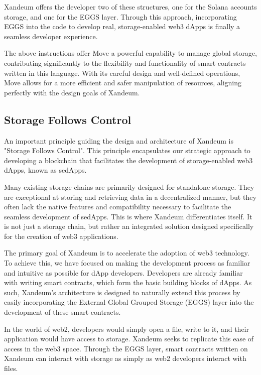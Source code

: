 \documentclass[11pt]{article}   	%
\begin{document}
Xandeum offers the developer two of these structures, one for the Solana accounts storage, and one for the EGGS layer. Through this approach, incorporating EGGS into the code to develop real, storage-enabled web3 dApps is finally a seamless developer experience.

The above instructions offer Move a powerful capability to manage global storage, contributing significantly to the flexibility and functionality of smart contracts written in this language. With its careful design and well-defined operations, Move allows for a more efficient and safer manipulation of resources, aligning perfectly with the design goals of Xandeum.

\subsection{Storage Follows Control}
An important principle guiding the design and architecture of Xandeum is "Storage Follows Control". This principle encapsulates our strategic approach to developing a blockchain that facilitates the development of storage-enabled web3 dApps, known as sedApps.

Many existing storage chains are primarily designed for standalone storage. They are exceptional at storing and retrieving data in a decentralized manner, but they often lack the native features and compatibility necessary to facilitate the seamless development of sedApps. This is where Xandeum differentiates itself. It is not just a storage chain, but rather an integrated solution designed specifically for the creation of web3 applications.

The primary goal of Xandeum is to accelerate the adoption of web3 technology. To achieve this, we have focused on making the development process as familiar and intuitive as possible for dApp developers. Developers are already familiar with writing smart contracts, which form the basic building blocks of dApps. As such, Xandeum's architecture is designed to naturally extend this process by easily incorporating the External Global Grouped Storage (EGGS) layer into the development of these smart contracts.

In the world of web2, developers would simply open a file, write to it, and their application would have access to storage. Xandeum seeks to replicate this ease of access in the web3 space. Through the EGGS layer, smart contracts written on Xandeum can interact with storage as simply as web2 developers interact with files.
\end{document}
